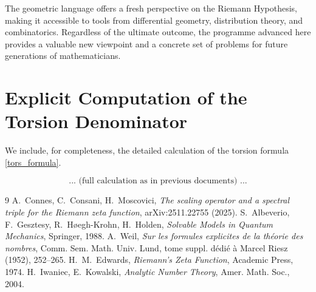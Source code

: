 \documentclass[12pt,a4paper,oneside]{book}
\begin{document}
The geometric language offers a fresh perspective on the Riemann Hypothesis, making it accessible to tools from differential geometry, distribution theory, and combinatorics.  Regardless of the ultimate outcome, the programme advanced here provides a valuable new viewpoint and a concrete set of problems for future generations of mathematicians.

\appendix
\chapter{Explicit Computation of the Torsion Denominator}
We include, for completeness, the detailed calculation of the torsion formula \eqref{tors_formula}.

\[
\text{... (full calculation as in previous documents) ...}
\]


\begin{thebibliography}{9}
A.~Connes, C.~Consani, H.~Moscovici,
\emph{The scaling operator and a spectral triple for the Riemann zeta function},
arXiv:2511.22755 (2025).
S.~Albeverio, F.~Gesztesy, R.~H{\o}egh-Krohn, H.~Holden,
\emph{Solvable Models in Quantum Mechanics}, Springer, 1988.
A.~Weil,
\emph{Sur les formules explicites de la th\'eorie des nombres},
Comm. Sem. Math. Univ. Lund, tome suppl. d\'edi\'e \`a Marcel Riesz (1952), 252--265.
H.~M.~Edwards,
\emph{Riemann's Zeta Function}, Academic Press, 1974.
H.~Iwaniec, E.~Kowalski,
\emph{Analytic Number Theory}, Amer. Math. Soc., 2004.
\end{thebibliography}
\end{document}
